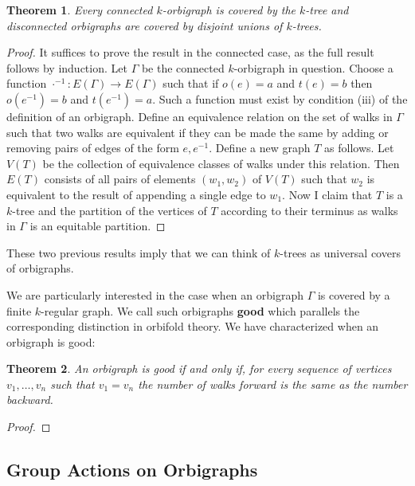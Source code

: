 \documentclass[12pt]{article}
\theoremstyle{plain}
\newtheorem{theorem}{Theorem}
\theoremstyle{definition}
\theoremstyle{remark}
\begin{document}
    \begin{theorem}\label{UniversalCovers}
      Every connected $k$-orbigraph is covered by the $k$-tree and disconnected orbigraphs are covered by disjoint unions of $k$-trees.
    \end{theorem}
    \begin{proof}
      It suffices to prove the result in the connected case, as the full result follows by induction. Let $\Gamma$ be the connected $k$-orbigraph in question. Choose a function $\cdot^{-1} : E(\Gamma) \to E(\Gamma)$ such that if $o(e) = a$ and $t(e) = b$ then $o(e^{-1}) = b$ and $t(e^{-1}) = a$. Such a function must exist by condition (iii) of the definition of an orbigraph. Define an equivalence relation on the set of walks in $\Gamma$ such that two walks are equivalent if they can be made the same by adding or removing pairs of edges of the form $e,e^{-1}$. Define a new graph $T$ as follows. Let $V(T)$ be the collection of equivalence classes of walks under this relation. Then $E(T)$ consists of all pairs of elements $(w_1, w_2)$ of $V(T)$ such that $w_2$ is equivalent to the result of appending a single edge to $w_1$. Now I claim that $T$ is a $k$-tree and the partition of the vertices of $T$ according to their terminus as walks in $\Gamma$ is an equitable partition.
    \end{proof}

    These two previous results imply that we can think of $k$-trees as universal covers of orbigraphs.

    We are particularly interested in the case when an orbigraph $\Gamma$ is covered by a finite $k$-regular graph. We call such orbigraphs \textbf{good} which parallels the corresponding distinction in orbifold theory. We have characterized when an orbigraph is good:

    \begin{theorem}\label{GoodCharacterization}
      An orbigraph is good if and only if, for every sequence of vertices $v_1,\ldots,v_n$ such that $v_1 = v_n$ the number of walks forward is the same as the number backward.
    \end{theorem}
    \begin{proof}
      
    \end{proof}


  \subsection{Group Actions on Orbigraphs}
\end{document}
